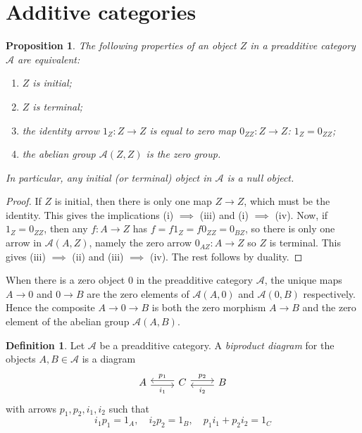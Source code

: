 \documentclass[10pt,oneside]{book}
\def\~#1{\mathscr{#1}}
\theoremstyle{plain}
\newtheorem{prop}[thm]{Proposition}
\theoremstyle{definition}
\newtheorem{defn}[thm]{Definition}
\theoremstyle{remark}
\numberwithin{equation}{section}
\numberwithin{figure}{section}
\begin{document}
    
\section{Additive categories}

\begin{prop}
    The following properties of an object $Z$ in a preadditive category $\~A$ are equivalent:
    \begin{enumerate}[label=(\roman*)]
        \item $Z$ is initial;
        \item $Z$ is terminal;
        \item the identity arrow $1_Z: Z \to Z$ is equal to zero map $0_{ZZ}: Z \to Z$: $1_Z = 0_{ZZ}$;
        \item the abelian group $\~A(Z, Z)$ is the zero group.
    \end{enumerate}
    In particular, any initial (or terminal) object in $\~A$ is a null object.
\end{prop}

\begin{proof}
    If $Z$ is initial, then there is only one map $Z \to Z$, which must be the identity. This gives the implications (i) $\implies$ (iii) and (i) $\implies$ (iv). Now, if $1_Z = 0_{ZZ}$, then any $f: A \to Z$ has $f = f1_Z = f0_{ZZ} = 0_{BZ}$, so there is only one arrow in $\~A(A, Z)$, namely the zero arrow $0_{AZ}: A \to Z$ so $Z$ is terminal. This gives (iii) $\implies$ (ii) and (iii) $\implies$ (iv). The rest follows by duality.
\end{proof}

When there is a zero object $0$ in the preadditive category $\~A$, the unique maps $A \to 0$ and $0 \to B$ are the zero elements of $\~A(A, 0)$ and $\~A(0, B)$ respectively. Hence the composite $A \to 0 \to B$ is both the zero morphism $A \to B$ and the zero element of the abelian group $\~A(A, B)$.

\begin{defn}
    Let $\~A$ be a preadditive category. A \emph{biproduct diagram} for the objects $A, B \in \~A$ is a diagram 
    \begin{equation}
    \label{eq:biprod_diagram}
        \begin{tikzcd}
            A & C & B
            \arrow["{i_1}"', shift right, from=1-1, to=1-2]
            \arrow["{p_1}"', shift right, from=1-2, to=1-1]
            \arrow["{p_2}", shift left, from=1-2, to=1-3]
            \arrow["{i_2}", shift left, from=1-3, to=1-2]
        \end{tikzcd}
    \end{equation}
with arrows $p_1, p_2, i_1, i_2$ such that 
\begin{equation}
\label{eq:biproduct_rules}
i_1 p_1 = 1_A, \quad i_2 p_2 = 1_B, \quad p_1 i_1 + p_2 i_2 = 1_C
\end{equation}
\end{defn}
\end{document}
